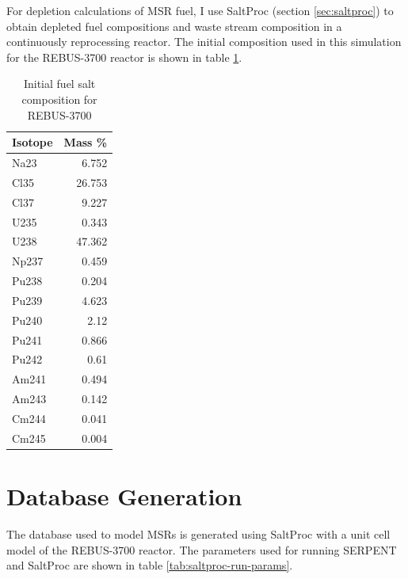 For depletion calculations of \gls{MSR} fuel, I use SaltProc (section \ref{sec:saltproc})
to obtain depleted fuel compositions and waste stream composition in a continuously
reprocessing reactor. The initial composition used in this simulation for the REBUS-3700
reactor is shown in table \ref{tab:rebus_init}.


\begin{table}[h]
	\centering
	\caption{Initial fuel salt composition for REBUS-3700}
	\begin{tabular}{lr}
		\hline
		\textbf{Isotope} & \textbf{Mass \%}\\
		\hline
		Na23	&	6.752	\\
		Cl35	&	26.753	\\
		Cl37	&	9.227	\\
		U235	&	0.343	\\
		U238	&	47.362	\\
		Np237	&	0.459	\\
		Pu238	&	0.204	\\
		Pu239	&	4.623	\\
		Pu240	&	2.12	\\
		Pu241	&	0.866	\\
		Pu242	&	0.61	\\
		Am241	&	0.494	\\
		Am243	&	0.142	\\
		Cm244	&	0.041	\\
		Cm245	&	0.004	\\
		\hline
	\end{tabular}
	
	\label{tab:rebus_init}
	
\end{table}

\section{Database Generation}
The database used to model \glspl{MSR} is generated using SaltProc
with a unit cell model of the REBUS-3700 reactor. The parameters
used for running SERPENT and SaltProc are shown in table \ref{tab:saltproc-run-params}.

